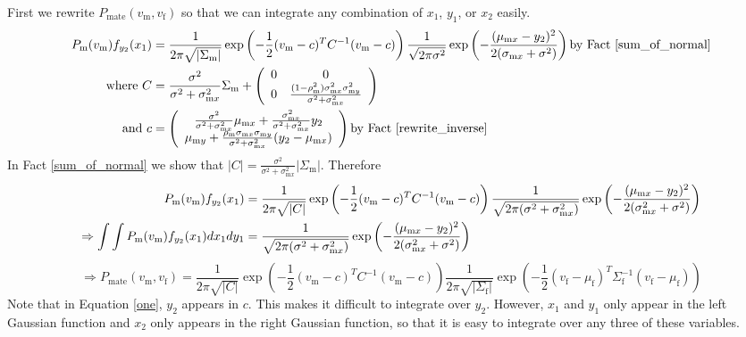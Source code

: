 \documentclass{article}
\newcommand{\x}[1]{\text{#1}}
\begin{document}
First we rewrite $P_\x{mate}(v_\x{m},v_\x{f})$ so that we can integrate any combination of $x_1$, $y_1$, or $x_2$ easily.
\begin{align*}
P_\x{m}(v_\x{m})f_{y_2}(x_1)&=\frac{1}{2\pi\sqrt{|\Sigma_\x{m}|}}\exp\left(-\frac{1}{2}(v_\x{m}-c)^TC^{-1}(v_\x{m}-c)\right)\frac{1}{\sqrt{2\pi\sigma^2}}\exp\left(-\frac{(\mu_{\x{m}x}-y_2)^2}{2(\sigma_{\x{m}x}+\sigma^2)}\right) \text{by Fact \ref{sum_of_normal}}
\\ \text{ where } C&=\frac{\sigma^2}{\sigma^2+\sigma_{\x{m}x}^2}\Sigma_\x{m}+\left(\begin{array}{cc} 0 & 0 \\ 0 & \frac{(1-\rho_\x{m}^2)\sigma_{\x{m}x}^2\sigma_{\x{m}y}^2}{\sigma^2+\sigma_{\x{m}x}^2}\end{array}\right) 
\\ \text{ and } c&= \left(\begin{array}{cc}\frac{\sigma^2}{\sigma^2+\sigma_{\x{m}x}^2}\mu_{\x{m}x}+\frac{\sigma_{\x{m}x}^2}{\sigma^2+\sigma_{\x{m}x}^2}y_2 
\\ \mu_{\x{m}y}+\frac{\rho_\x{m}\sigma_{\x{m}x}\sigma_{\x{m}y}}{\sigma^2+\sigma_{\x{m}x}^2}(y_2-\mu_{\x{m}x}) \end{array}\right) \text{by Fact \ref{rewrite_inverse}}
\end{align*}
In Fact \ref{sum_of_normal} we show that $|C|=\frac{\sigma^2}{\sigma^2+\sigma_{\x{m}x}^2}|\Sigma_\x{m}|$. Therefore 
\begin{align}
P_\x{m}(v_\x{m})f_{y_2}(x_1)&=\frac{1}{2\pi\sqrt{|C|}}\exp\left(-\frac{1}{2}(v_\x{m}-c)^TC^{-1}(v_\x{m}-c)\right)\frac{1}{\sqrt{2\pi(\sigma^2+\sigma_{\x{m}x}^2)}}\exp\left(-\frac{(\mu_{\x{m}x}-y_2)^2}{2(\sigma_{\x{m}x}^2+\sigma^2)}\right) \notag
\\ \Rightarrow \int\int P_\x{m}(v_\x{m})f_{y_2}(x_1)dx_1dy_1&=\frac{1}{\sqrt{2\pi(\sigma^2+\sigma_{\x{m}x}^2)}}\exp\left(-\frac{(\mu_{\x{m}x}-y_2)^2}{2(\sigma_{\x{m}x}^2+\sigma^2)}\right) \label{Z}
\end{align}
\begin{equation} \label{one}
\Rightarrow P_\x{mate}(v_\x{m},v_\x{f})=\frac{1}{2\pi\sqrt{|C|}}\exp\left(-\frac{1}{2}(v_\x{m}-c)^TC^{-1}(v_\x{m}-c)\right)\frac{1}{2\pi\sqrt{|\Sigma_\x{f}|}}\exp\left(-\frac{1}{2}(v_\x{f}-\mu_\x{f})^T\Sigma_\x{f}^{-1}(v_\x{f}-\mu_\x{f})\right)
\end{equation}
Note that in Equation \ref{one}, $y_2$ appears in $c$. This makes it difficult to integrate over $y_2$. However, $x_1$ and $y_1$ only appear in the left Gaussian function and $x_2$ only appears in the right Gaussian function, so that it is easy to integrate over any three of these variables.
\end{document}

